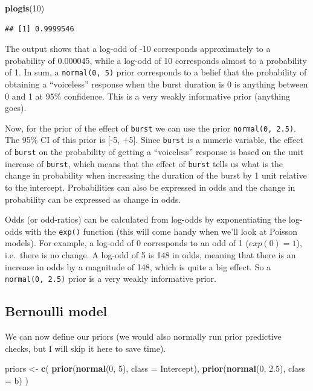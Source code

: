 \documentclass[
]{article}
\newenvironment{Shaded}{\begin{snugshade}}{\end{snugshade}}
\newcommand{\DataTypeTok}[1]{\textcolor[rgb]{0.13,0.29,0.53}{#1}}
\newcommand{\DecValTok}[1]{\textcolor[rgb]{0.00,0.00,0.81}{#1}}
\newcommand{\FloatTok}[1]{\textcolor[rgb]{0.00,0.00,0.81}{#1}}
\newcommand{\KeywordTok}[1]{\textcolor[rgb]{0.13,0.29,0.53}{\textbf{#1}}}
\newcommand{\NormalTok}[1]{#1}
\newcommand{\StringTok}[1]{\textcolor[rgb]{0.31,0.60,0.02}{#1}}
\begin{document}
\begin{Shaded}
\begin{Highlighting}[]
\KeywordTok{plogis}\NormalTok{(}\DecValTok{10}\NormalTok{)}
\end{Highlighting}
\end{Shaded}

\begin{verbatim}
## [1] 0.9999546
\end{verbatim}

The output shows that a log-odd of -10 corresponds approximately to a
probability of 0.000045, while a log-odd of 10 corresponds almost to a
probability of 1. In sum, a \texttt{normal(0,\ 5)} prior corresponds to
a belief that the probability of obtaining a ``voiceless'' response when
the burst duration is 0 is anything between 0 and 1 at 95\% confidence.
This is a very weakly informative prior (anything goes).

Now, for the prior of the effect of \texttt{burst} we can use the prior
\texttt{normal(0,\ 2.5)}. The 95\% CI of this prior is {[}-5, +5{]}.
Since \texttt{burst} is a numeric variable, the effect of \texttt{burst}
on the probability of getting a ``voiceless'' response is based on the
unit increase of \texttt{burst}, which means that the effect of
\texttt{burst} tells us what is the change in probability when
increasing the duration of the burst by 1 unit relative to the
intercept. Probabilities can also be expressed in odds and the change in
probability can be expressed as change in odds.

Odds (or odd-ratios) can be calculated from log-odds by exponentiating
the log-odds with the \texttt{exp()} function (this will come handy when
we'll look at Poisson models). For example, a log-odd of 0 corresponds
to an odd of 1 (\(exp(0) = 1\)), i.e.~there is no change. A log-odd of 5
is 148 in odds, meaning that there is an increase in odds by a magnitude
of 148, which is quite a big effect. So a \texttt{normal(0,\ 2.5)} prior
is a very weakly informative prior.

\hypertarget{bernoulli-model}{%
\subsection{Bernoulli model}\label{bernoulli-model}}

We can now define our priors (we would also normally run prior
predictive checks, but I will skip it here to save time).

\begin{Shaded}
\begin{Highlighting}[]
\NormalTok{priors \textless{}{-}}\StringTok{ }\KeywordTok{c}\NormalTok{(}
  \KeywordTok{prior}\NormalTok{(}\KeywordTok{normal}\NormalTok{(}\DecValTok{0}\NormalTok{, }\DecValTok{5}\NormalTok{), }\DataTypeTok{class =}\NormalTok{ Intercept),}
  \KeywordTok{prior}\NormalTok{(}\KeywordTok{normal}\NormalTok{(}\DecValTok{0}\NormalTok{, }\FloatTok{2.5}\NormalTok{), }\DataTypeTok{class =}\NormalTok{ b)}
\NormalTok{)}
\end{Highlighting}
\end{Shaded}
\end{document}
